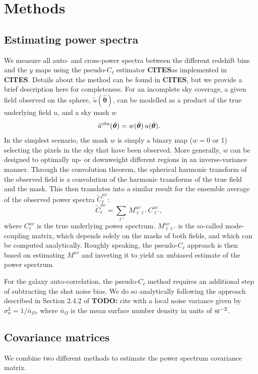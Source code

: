 \documentclass[useAMS,usenatbib]{mn2e}
\newcommand{\nv}{\hat{\boldsymbol{\theta}}}
\newcommand{\cites}{{\bf CITES}}
\newcommand{\todo}[1]{{\bf TODO:} #1}
\begin{document}
\section{Methods}\label{sec:methods}
  \subsection{Estimating power spectra}\label{ssec:methods.cls}
    We measure all auto- and cross-power spectra between the different redshift bins and the $y$ maps using the pseudo-$C_\ell$ estimator \cites as implemented in \cites. Details about the method can be found in \cites, but we provide a brief description here for completeness. For an incomplete sky coverage, a given field observed on the sphere, $\tilde{u}(\nv)$, can be modelled as a product of the true underlying field $u$, and a sky mask $w$
    \begin{equation}
      \tilde{u}^{\rm obs}(\nv) = w(\nv)\,u(\nv).
    \end{equation}
    In the simplest scenario, the mask $w$ is simply a binary map ($w=0$ or 1) selecting the pixels in the sky that have been observed. More generally, $w$ can be designed to optimally up- or downweight different regions in an inverse-variance manner. Through the convolution theorem, the spherical harmonic transform of the observed field is a convolution of the harmonic transforms of the true field and the mask. This then translates into a similar result for the ensemble average of the observed power spectra $\tilde{C}^{uv}_\ell$:
    \begin{equation}
      \tilde{C}^{uv}_\ell = \sum_{\ell'}\,M^{uv}_{\ell \ell'}\, C^{uv}_{\ell'},
    \end{equation}
    where $C^{uv}_\ell$ is the true underlying power spectrum. $M^{uv}_{\ell \ell'}$ is the so-called mode-coupling matrix, which depends solely on the masks of both fields, and which can be computed analytically. Roughly speaking, the pseudo-$C_\ell$ approach is then based on estimating $M^{uv}$ and inverting it to yield an unbiased estimate of the power spectrum.
    
    For the galaxy auto-correlation, the pseudo-$C_\ell$ method requires an additional step of subtracting the shot noise bias. We do so analytically following the approach described in Section 2.4.2 of \todo{cite} with a local noise variance given by $\sigma_n^2=1/\bar{n}_\Omega$, where $\bar{n}_\Omega$ is the mean surface number density in units of ${\rm sr}^{-2}$.

  \subsection{Covariance matrices}\label{ssec:methods.cov}
    We combine two different methods to estimate the power spectrum covariance matrix. 
    
\end{document}
